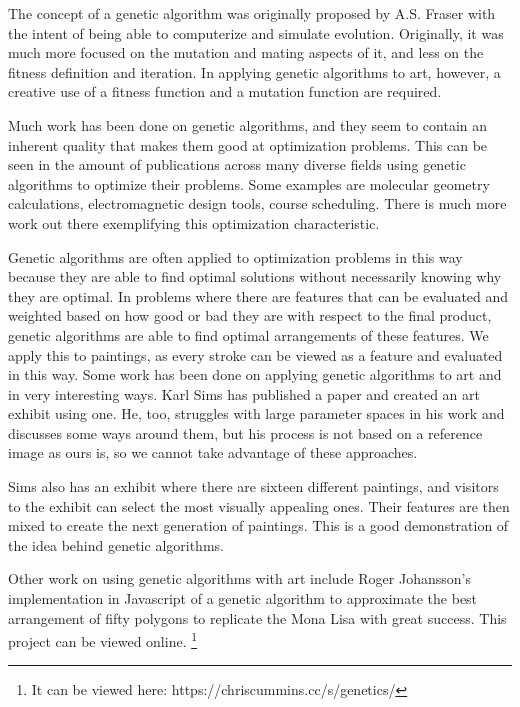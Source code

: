 The concept of a genetic algorithm was originally proposed by A.S. Fraser with the intent of being able to computerize and simulate evolution.\cite{fraser1957simulation} Originally, it was much more focused on the mutation and mating aspects of it, and less on the fitness definition and iteration. In applying genetic algorithms to art, however, a creative use of a fitness function and a mutation function are required. 

Much work has been done on genetic algorithms, and they seem to contain an inherent quality that makes them good at optimization problems. This can be seen in the amount of publications across many diverse fields using genetic algorithms to optimize their problems. Some examples are molecular geometry calculations,\cite{molecular} electromagnetic design tools,\cite{electro} course scheduling.\cite{courses} There is much more work out there exemplifying this optimization characteristic. \cite{genetic1}\cite{genetic2}\cite{genetic3}\cite{genetic4}\cite{genetic5}

Genetic algorithms are often applied to optimization problems in this way because they are able to find optimal solutions without necessarily knowing why they are optimal. In problems where there are features that can be evaluated and weighted based on how good or bad they are with respect to the final product, genetic algorithms are able to find optimal arrangements of these features. We apply this to paintings, as every stroke can be viewed as a feature and evaluated in this way. Some work has been done on applying genetic algorithms to art and in very interesting ways. Karl Sims has published a paper and created an art exhibit using one.\cite{sims} He, too, struggles with large parameter spaces in his work and discusses some ways around them, but his process is not based on a reference image as ours is, so we cannot take advantage of these approaches. %

Sims also has an exhibit where there are sixteen different paintings, and visitors to the exhibit can select the most visually appealing ones. Their features are then mixed to create the next generation of paintings. This is a good demonstration of the idea behind genetic algorithms.

Other work on using genetic algorithms with art include Roger Johansson's implementation in Javascript of a genetic algorithm to approximate the best arrangement of fifty polygons to replicate the Mona Lisa with great success.\cite{monalisa} This project can be viewed online. \footnote{It can be viewed here: https://chriscummins.cc/s/genetics/}


